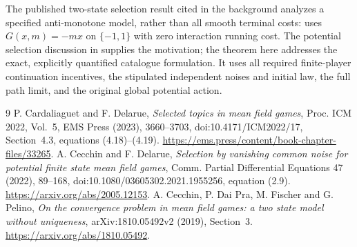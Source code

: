 \documentclass[11pt,a4paper]{article}
\begin{document}
The published two-state selection result cited in the background
analyzes a specified anti-monotone model, rather than all smooth
terminal costs: \cite[Section~3]{CDFP} uses $G(x,m)=-mx$ on
$\{-1,1\}$ with zero interaction running cost. The potential
selection discussion in \cite[Section~4.3]{ICM} supplies the motivation;
the theorem here addresses the exact, explicitly quantified catalogue
formulation. It uses all required finite-player continuation incentives,
the stipulated independent noises and initial law, the full path
limit, and the original global potential action.

\begin{thebibliography}{9}
 P. Cardaliaguet and F. Delarue,
\emph{Selected topics in mean field games}, Proc. ICM 2022, Vol.~5,
EMS Press (2023), 3660--3703, doi:10.4171/ICM2022/17,
Section~4.3, equations (4.18)--(4.19).
\url{https://ems.press/content/book-chapter-files/33265}.
 A. Cecchin and F. Delarue,
\emph{Selection by vanishing common noise for potential finite state
mean field games}, Comm. Partial Differential Equations 47 (2022),
89--168, doi:10.1080/03605302.2021.1955256, equation (2.9).
\url{https://arxiv.org/abs/2005.12153}.
 A. Cecchin, P. Dai Pra, M. Fischer and G. Pelino,
\emph{On the convergence problem in mean field games: a two state
model without uniqueness}, arXiv:1810.05492v2 (2019), Section~3.
\url{https://arxiv.org/abs/1810.05492}.
\end{thebibliography}
\end{document}
